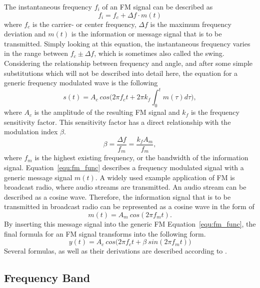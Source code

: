 \noindent
The instantaneous frequency $f_i$ of an FM signal can be described as
\begin{equation}
  f_i = f_c + \Delta f \cdot m(t)
\end{equation}
where $f_c$ is the carrier- or center frequency, $\Delta f$ is the maximum frequency deviation and $m(t)$ is the information or message signal that is to be transmitted.
Simply looking at this equation, the instantaneous frequency varies in the range between $f_c \pm \Delta f$, which is sometimes also called the swing.
Considering the relationship between frequency and angle, and after some simple substitutions which will not be described into detail here, the equation for a generic frequency modulated wave is the following
\begin{equation}
  s(t) = A_c\ cos \Big( 2 \pi f_c t + 2 \pi k_f \int_{0}^{t} m(\tau) d\tau \Big),
  \label{equ:fm_func}
\end{equation}
where $A_c$ is the amplitude of the resulting FM signal and $k_f$ is the frequency sensitivity factor.
This sensitivity factor has a direct relationship with the modulation index $\beta$.
\begin{equation}
  \beta = \frac{\Delta f}{f_m} = \frac{k_f A_m}{f_m},
\end{equation}
where $f_m$ is the highest existing frequency, or the bandwidth of the information signal.
Equation~\eqref{equ:fm_func} describes a frequency modulated signal with a generic message signal $m(t)$.
A widely used example application of FM is broadcast radio, where audio streams are transmitted.
An audio stream can be described as a cosine wave.
Therefore, the information signal that is to be transmitted in broadcast radio can be represented as a cosine wave in the form of
\begin{equation}
  m(t) = A_m\ cos(2 \pi f_m t).
\end{equation}
By inserting this message signal into the generic FM Equation~\eqref{equ:fm_func}, the final formula for an FM signal transforms into the following form.
\begin{equation}
  y(t) = A_c\ cos \Big(2 \pi f_c t + \beta\ sin(2 \pi f_m t)\Big )
\end{equation}
Several formulas, as well as their derivations are described according to \cite[pg.54-55]{MatinMohammadA2018CSfE}.

\subsection{Frequency Band}
\label{sec:FrequencyBand}

